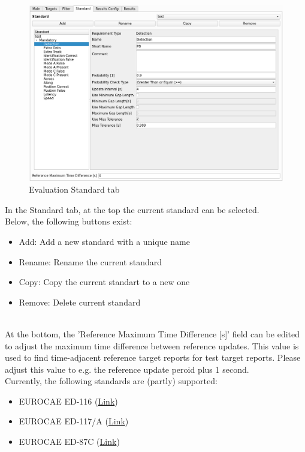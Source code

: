 \begin{figure}[H]
  \hspace*{-2cm}
    \includegraphics[width=18cm,frame]{figures/eval_standard.png}
  \caption{Evaluation Standard tab}
\end{figure}

In the Standard tab, at the top the current standard can be selected. \\

Below, the following buttons exist:
\begin{itemize}  
\item Add: Add a new standard with a unique name
\item Rename: Rename the current standard
\item Copy: Copy the current standart to a new one
\item Remove: Delete current standard
\end{itemize}
\ \\

At the bottom, the 'Reference Maximum Time Difference [s]' field can be edited to adjust the maximum time difference between reference updates. This value is used to find time-adjacent reference target reports for test target reports. Please adjust this value to e.g. the reference update peroid plus 1 second. \\

Currently, the following standards are (partly) supported:
\begin{itemize}  
\item EUROCAE ED-116 (\href{https://eshop.eurocae.net/eurocae-documents-and-reports/ed-116/}{Link})
\item EUROCAE ED-117/A (\href{https://eshop.eurocae.net/eurocae-documents-and-reports/ed-117a/}{Link})
\item EUROCAE ED-87C (\href{https://eshop.eurocae.net/eurocae-documents-and-reports/ed-87c/}{Link})
\end{itemize}
\ \\

